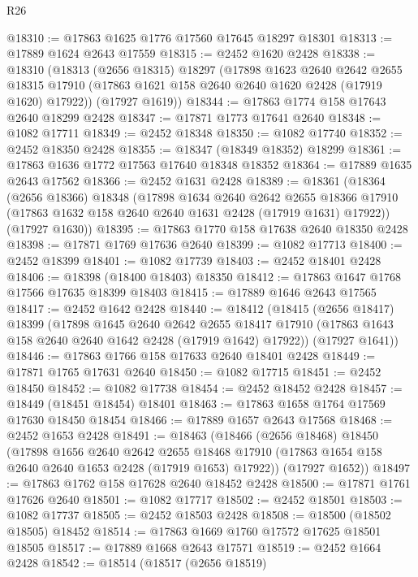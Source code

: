 \begin{lexlean}{R26}
\begin{coremodule}
@18310 := @17863 @1625 @1776 @17560 @17645 @18297 @18301
@18313 := @17889 @1624 @2643 @17559
@18315 := @2452 @1620 @2428
@18338 := @18310
    (@18313
      (@2656 @18315)
      @18297
      (@17898
        @1623
        @2640
        @2642
        @2655
        @18315
        @17910
        (@17863 @1621 @158 @2640 @2640 @1620 @2428 (@17919 @1620) @17922))
      (@17927 @1619))
@18344 := @17863 @1774 @158 @17643 @2640 @18299 @2428
@18347 := @17871 @1773 @17641 @2640
@18348 := @1082 @17711
@18349 := @2452 @18348
@18350 := @1082 @17740
@18352 := @2452 @18350 @2428
@18355 := @18347 (@18349 @18352) @18299
@18361 := @17863 @1636 @1772 @17563 @17640 @18348 @18352
@18364 := @17889 @1635 @2643 @17562
@18366 := @2452 @1631 @2428
@18389 := @18361
    (@18364
      (@2656 @18366)
      @18348
      (@17898
        @1634
        @2640
        @2642
        @2655
        @18366
        @17910
        (@17863 @1632 @158 @2640 @2640 @1631 @2428 (@17919 @1631) @17922))
      (@17927 @1630))
@18395 := @17863 @1770 @158 @17638 @2640 @18350 @2428
@18398 := @17871 @1769 @17636 @2640
@18399 := @1082 @17713
@18400 := @2452 @18399
@18401 := @1082 @17739
@18403 := @2452 @18401 @2428
@18406 := @18398 (@18400 @18403) @18350
@18412 := @17863 @1647 @1768 @17566 @17635 @18399 @18403
@18415 := @17889 @1646 @2643 @17565
@18417 := @2452 @1642 @2428
@18440 := @18412
    (@18415
      (@2656 @18417)
      @18399
      (@17898
        @1645
        @2640
        @2642
        @2655
        @18417
        @17910
        (@17863 @1643 @158 @2640 @2640 @1642 @2428 (@17919 @1642) @17922))
      (@17927 @1641))
@18446 := @17863 @1766 @158 @17633 @2640 @18401 @2428
@18449 := @17871 @1765 @17631 @2640
@18450 := @1082 @17715
@18451 := @2452 @18450
@18452 := @1082 @17738
@18454 := @2452 @18452 @2428
@18457 := @18449 (@18451 @18454) @18401
@18463 := @17863 @1658 @1764 @17569 @17630 @18450 @18454
@18466 := @17889 @1657 @2643 @17568
@18468 := @2452 @1653 @2428
@18491 := @18463
    (@18466
      (@2656 @18468)
      @18450
      (@17898
        @1656
        @2640
        @2642
        @2655
        @18468
        @17910
        (@17863 @1654 @158 @2640 @2640 @1653 @2428 (@17919 @1653) @17922))
      (@17927 @1652))
@18497 := @17863 @1762 @158 @17628 @2640 @18452 @2428
@18500 := @17871 @1761 @17626 @2640
@18501 := @1082 @17717
@18502 := @2452 @18501
@18503 := @1082 @17737
@18505 := @2452 @18503 @2428
@18508 := @18500 (@18502 @18505) @18452
@18514 := @17863 @1669 @1760 @17572 @17625 @18501 @18505
@18517 := @17889 @1668 @2643 @17571
@18519 := @2452 @1664 @2428
@18542 := @18514
    (@18517
      (@2656 @18519)

\end{coremodule}
\end{lexlean}
